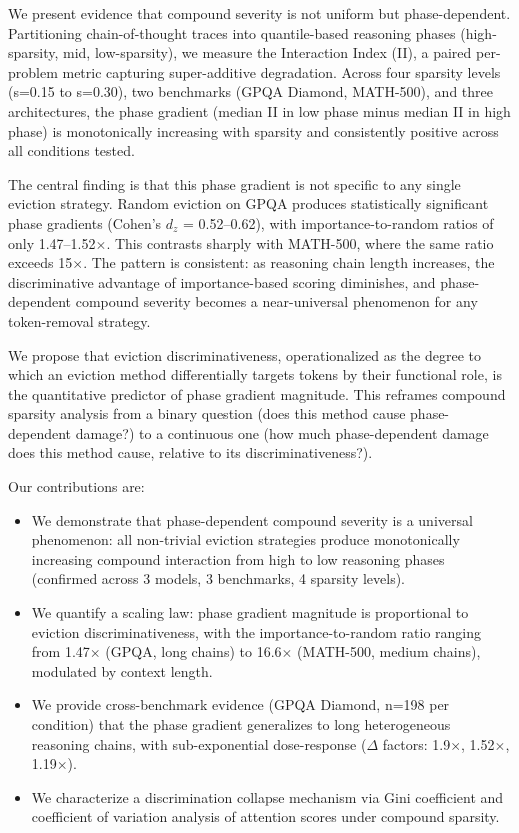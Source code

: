 \documentclass[11pt,a4paper]{article}
\begin{document}
We present evidence that compound severity is not uniform but phase-dependent. Partitioning chain-of-thought traces into quantile-based reasoning phases (high-sparsity, mid, low-sparsity), we measure the Interaction Index (II), a paired per-problem metric capturing super-additive degradation. Across four sparsity levels (s=0.15 to s=0.30), two benchmarks (GPQA Diamond, MATH-500), and three architectures, the phase gradient (median II in low phase minus median II in high phase) is monotonically increasing with sparsity and consistently positive across all conditions tested.

The central finding is that this phase gradient is not specific to any single eviction strategy. Random eviction on GPQA produces statistically significant phase gradients (Cohen's $d_z$ = 0.52--0.62), with importance-to-random ratios of only 1.47--1.52$\times$. This contrasts sharply with MATH-500, where the same ratio exceeds 15$\times$. The pattern is consistent: as reasoning chain length increases, the discriminative advantage of importance-based scoring diminishes, and phase-dependent compound severity becomes a near-universal phenomenon for any token-removal strategy.

We propose that eviction discriminativeness, operationalized as the degree to which an eviction method differentially targets tokens by their functional role, is the quantitative predictor of phase gradient magnitude. This reframes compound sparsity analysis from a binary question (does this method cause phase-dependent damage?) to a continuous one (how much phase-dependent damage does this method cause, relative to its discriminativeness?).

Our contributions are:
\begin{itemize}
    \item We demonstrate that phase-dependent compound severity is a universal phenomenon: all non-trivial eviction strategies produce monotonically increasing compound interaction from high to low reasoning phases (confirmed across 3 models, 3 benchmarks, 4 sparsity levels).
    \item We quantify a scaling law: phase gradient magnitude is proportional to eviction discriminativeness, with the importance-to-random ratio ranging from 1.47$\times$ (GPQA, long chains) to 16.6$\times$ (MATH-500, medium chains), modulated by context length.
    \item We provide cross-benchmark evidence (GPQA Diamond, n=198 per condition) that the phase gradient generalizes to long heterogeneous reasoning chains, with sub-exponential dose-response ($\Delta$ factors: 1.9$\times$, 1.52$\times$, 1.19$\times$).
    \item We characterize a discrimination collapse mechanism via Gini coefficient and coefficient of variation analysis of attention scores under compound sparsity.
\end{itemize}
\end{document}
